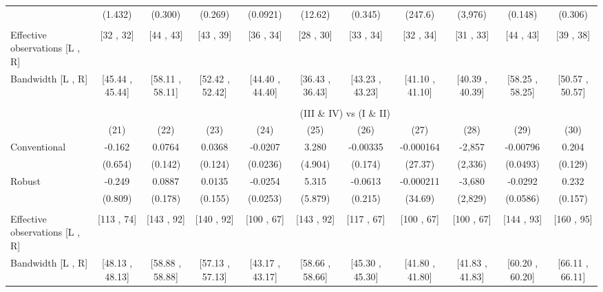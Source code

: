 \begin{tabular}{lcccccccccc}
      & (1.432) & (0.300) & (0.269) & (0.0921) & (12.62) & (0.345) & (247.6) & (3,976) & (0.148) & (0.306) \\
      &       &       &       &       &       &       &       &       &       &  \\
\midrule
Effective observations [L , R] & [32 , 32] & [44 , 43] & [43 , 39] & [36 , 34] & [28 , 30] & [33 , 34] & [32 , 34] & [31 , 33] & [44 , 43] & [39 , 38] \\
Bandwidth [L , R] & [45.44 , 45.44] & [58.11 , 58.11] & [52.42 , 52.42] & [44.40 , 44.40] & [36.43 , 36.43] & [43.23 , 43.23] & [41.10 , 41.10] & [40.39 , 40.39] & [58.25 , 58.25] & [50.57 , 50.57] \\
\midrule
\midrule
      &       &       &       &       &       &       &       &       &       &  \\
\midrule
      & \multicolumn{10}{c}{(III \& IV) vs (I \& II)} \\
\midrule
\midrule
      & (21)  & (22)  & (23)  & (24)  & (25)  & (26)  & (27)  & (28)  & (29)  & (30) \\
\midrule
\midrule
Conventional & -0.162 & 0.0764 & 0.0368 & -0.0207 & 3.280 & -0.00335 & -0.000164 & -2,857 & -0.00796 & 0.204 \\
      & (0.654) & (0.142) & (0.124) & (0.0236) & (4.904) & (0.174) & (27.37) & (2,336) & (0.0493) & (0.129) \\
Robust & -0.249 & 0.0887 & 0.0135 & -0.0254 & 5.315 & -0.0613 & -0.000211 & -3,680 & -0.0292 & 0.232 \\
      & (0.809) & (0.178) & (0.155) & (0.0253) & (5.879) & (0.215) & (34.69) & (2,829) & (0.0586) & (0.157) \\
      &       &       &       &       &       &       &       &       &       &  \\
\midrule
Effective observations [L , R] & [113 , 74] & [143 , 92] & [140 , 92] & [100 , 67] & [143 , 92] & [117 , 67] & [100 , 67] & [100 , 67] & [144 , 93] & [160 , 95] \\
Bandwidth [L , R] & [48.13 , 48.13] & [58.88 , 58.88] & [57.13 , 57.13] & [43.17 , 43.17] & [58.66 , 58.66] & [45.30 , 45.30] & [41.80 , 41.80] & [41.83 , 41.83] & [60.20 , 60.20] & [66.11 , 66.11] \\
\bottomrule
\bottomrule
\end{tabular}%
